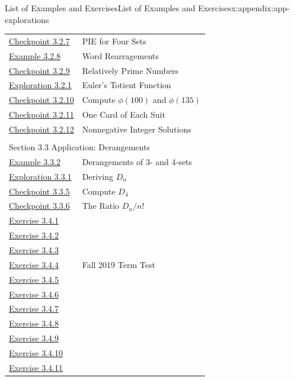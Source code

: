 \documentclass[oneside,10pt,]{book}
\numberwithin{equation}{section}
\begin{document}
\begin{appendixptx}{List of Examples and Exercises}{}{List of Examples and Exercises}{}{}{x:appendix:app-explorations}
\begin{longtable}[l]{ll}
\hyperref[x:exercise:ex-pie-4sets]{Checkpoint 3.2.7}& PIE for Four Sets\\
\hyperref[x:example:eg-pie-EQUATION]{Example 3.2.8}& Word Rearragements\\
\hyperref[x:exercise:ex-pie-relatively-prime]{Checkpoint 3.2.9}& Relatively Prime Numbers\\
\hyperref[x:exploration:expl-pie-euler-totient]{Exploration 3.2.1}& Euler's Totient Function\\
\hyperref[x:exercise:ex-pie-apply-totient]{Checkpoint 3.2.10}& Compute \(\phi(100)\) and \(\phi(135)\)\\
\hyperref[x:exercise:ex-pie-cards]{Checkpoint 3.2.11}& One Card of Each Suit\\
\hyperref[x:exercise:ex-pie-nonnegative]{Checkpoint 3.2.12}& Nonnegative Integer Solutions\\
\multicolumn{2}{l}{\null}\\[1.5ex] \multicolumn{2}{l}{\large Section 3.3 Application: Derangements}\\[0.5ex]
\hyperref[x:example:eg-derangement-34]{Example 3.3.2}& Derangements of 3- and 4-sets\\
\hyperref[x:exploration:expl-derangement-Dn]{Exploration 3.3.1}& Deriving \(D_n\)\\
\hyperref[x:exercise:ex-derangement-D4]{Checkpoint 3.3.5}& Compute \(D_4\)\\
\hyperref[x:exercise:ex-derangement-ratio]{Checkpoint 3.3.6}& The Ratio \(D_n/n!\)\\
\hyperlink{g:exercise:id531754}{Exercise 3.4.1}& \\
\hyperlink{g:exercise:id531801}{Exercise 3.4.2}& \\
\hyperlink{g:exercise:id531818}{Exercise 3.4.3}& \\
\hyperlink{g:exercise:id531827}{Exercise 3.4.4}& Fall 2019 Term Test\\
\hyperlink{g:exercise:id531856}{Exercise 3.4.5}& \\
\hyperlink{g:exercise:id531854}{Exercise 3.4.6}& \\
\hyperlink{g:exercise:id531904}{Exercise 3.4.7}& \\
\hyperlink{g:exercise:id531903}{Exercise 3.4.8}& \\
\hyperlink{g:exercise:id531951}{Exercise 3.4.9}& \\
\hyperlink{g:exercise:id531942}{Exercise 3.4.10}& \\
\hyperlink{g:exercise:id531934}{Exercise 3.4.11}& \\

\end{longtable}
\end{appendixptx}
\end{document}
